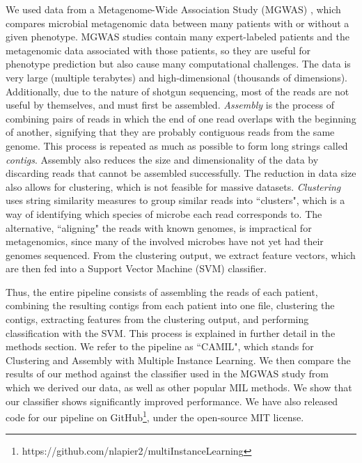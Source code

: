 We used data from a Metagenome-Wide Association Study (MGWAS) \cite{qin041012}, which compares microbial metagenomic data between many patients with or without a given phenotype. MGWAS studies contain many expert-labeled patients and the metagenomic data associated with those patients, so they are useful for phenotype prediction but also cause many computational challenges. The data is very large (multiple terabytes) and high-dimensional (thousands of dimensions). Additionally, due to the nature of shotgun sequencing, most of the reads are not useful by themselves, and must first be assembled. \emph{Assembly} is the process of combining pairs of reads in which the end of one read overlaps with the beginning of another, signifying that they are probably contiguous reads from the same genome. This process is repeated as much as possible to form long strings called \emph{contigs}. Assembly also reduces the size and dimensionality of the data by discarding reads that cannot be assembled successfully. The reduction in data size also allows for clustering, which is not feasible for massive datasets. \emph{Clustering} uses string similarity measures to group similar reads into ``clusters", which is a way of identifying which species of microbe each read corresponds to. The alternative, ``aligning" the reads with known genomes, is impractical for metagenomics, since many of the involved microbes have not yet had their genomes sequenced. From the clustering output, we extract feature vectors, which are then fed into a Support Vector Machine (SVM) classifier. 

Thus, the entire pipeline consists of assembling the reads of each patient, combining the resulting contigs from each patient into one file, clustering the contigs, extracting features from the clustering output, and performing classification with the SVM. This process is explained in further detail in the methods section. We refer to the pipeline as ``CAMIL", which stands for Clustering and Assembly with Multiple Instance Learning. We then compare the results of our method against the classifier used in the MGWAS study \cite{qin041012} from which we derived our data, as well as other popular MIL methods. We show that our classifier shows significantly improved performance. We have also released code for our pipeline on GitHub\footnote{https://github.com/nlapier2/multiInstanceLearning},
under the open-source MIT license.

